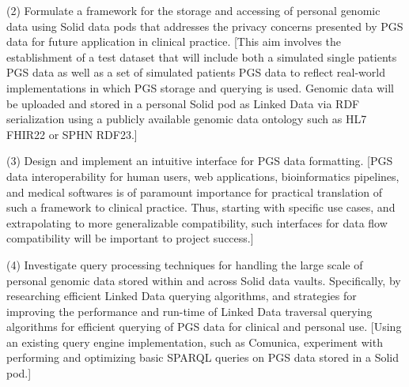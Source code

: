 \documentclass{article}
\begin{document}
(2) Formulate a framework for the storage and accessing of personal genomic data using Solid data pods that addresses the privacy concerns presented by PGS data for future application in clinical practice. [This aim involves the establishment of a test dataset that will include both a simulated single patient\textquotesingle s PGS data as well as a set of simulated patient\textquotesingle s PGS data to reflect real-world implementations in which PGS storage and querying is used. Genomic data will be uploaded and stored in a personal Solid pod as Linked Data via RDF serialization using a publicly available genomic data ontology such as HL7 FHIR22 or SPHN RDF23.]

(3) Design and implement an intuitive interface for PGS data formatting. [PGS data interoperability for human users, web applications, bioinformatics pipelines, and medical softwares is of paramount importance for practical translation of such a framework to clinical practice. Thus, starting with specific use cases, and extrapolating to more generalizable compatibility, such interfaces for data flow compatibility will be important to project success.]

(4) Investigate query processing techniques for handling the large scale of personal genomic data stored within and across Solid data vaults. Specifically, by researching efficient Linked Data querying algorithms, and strategies for improving the performance and run-time of Linked Data traversal querying algorithms for efficient querying of PGS data for clinical and personal use. [Using an existing query engine implementation, such as Comunica, experiment with performing and optimizing basic SPARQL queries on PGS data stored in a Solid pod.]

\end{document}

